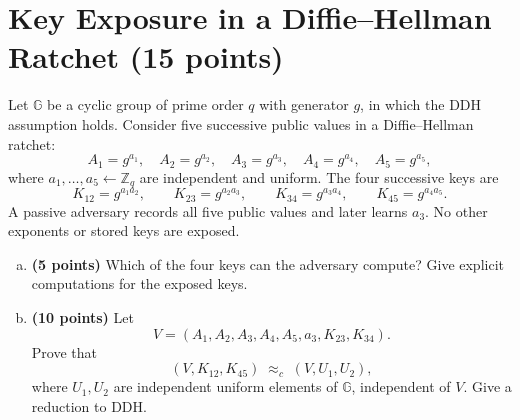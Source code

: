 \documentclass[11pt]{article}
\newcommand{\GG}{\mathbb{G}}
\newcommand{\ZZ}{\mathbb{Z}}
\begin{document}
\newpage
\section{Key Exposure in a Diffie--Hellman Ratchet (15 points)}
Let $\GG$ be a cyclic group of prime order $q$ with generator $g$, in
which the DDH assumption holds. Consider five successive public values
in a Diffie--Hellman ratchet:
\[
    A_1=g^{a_1},\quad A_2=g^{a_2},\quad A_3=g^{a_3},\quad
    A_4=g^{a_4},\quad A_5=g^{a_5},
\]
where $a_1,\ldots,a_5\leftarrow\ZZ_q$ are independent and uniform.
The four successive keys are
\[
    K_{12}=g^{a_1a_2},\qquad K_{23}=g^{a_2a_3},\qquad
    K_{34}=g^{a_3a_4},\qquad K_{45}=g^{a_4a_5}.
\]
A passive adversary records all five public values and later learns
$a_3$. No other exponents or stored keys are exposed.

\begin{enumerate}[(a)]
    \item \textbf{(5 points)} Which of the four keys can the adversary
    compute? Give explicit computations for the exposed keys.

    \item \textbf{(10 points)} Let
    \[
        V=(A_1,A_2,A_3,A_4,A_5,a_3,K_{23},K_{34}).
    \]
    Prove that
    \[
        (V,K_{12},K_{45})\;\approx_c\;(V,U_1,U_2),
    \]
    where $U_1,U_2$ are independent uniform elements of $\GG$, independent
    of $V$. Give a reduction to DDH.
\end{enumerate}
\end{document}
